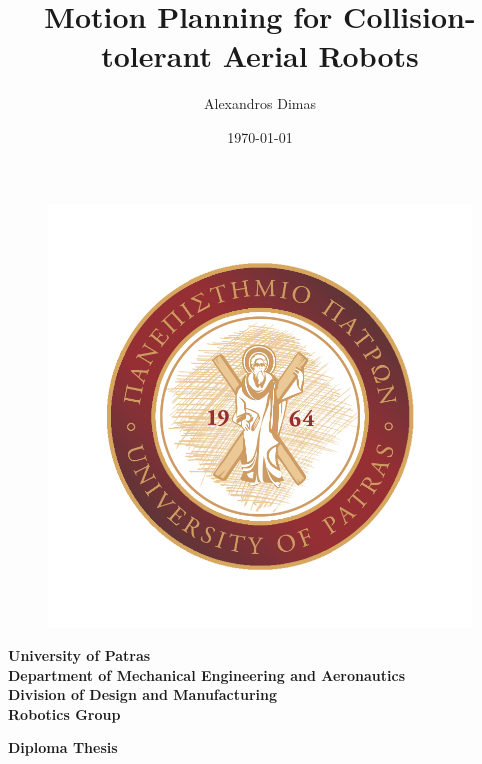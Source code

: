 \documentclass[twoside]{report}
\title{Motion Planning for Collision-tolerant Aerial Robots}
\author{Alexandros Dimas}
\date{\today}
\begin{document}
\begin{titlepage}


\begin{minipage}{0.25\textwidth}
\begin{figure}[H]
\includegraphics[width =\textwidth]{images/logo-up-4color-stamp.png}
\end{figure}
\end{minipage} \hfill
\begin{minipage}{0.85\textwidth}
{
\large \textbf{University of Patras}\\
\large \textbf{Department of Mechanical Engineering and Aeronautics}\\
\large \textbf{Division of Design and Manufacturing}\\
\large \textbf{Robotics Group}
}
\end{minipage}

\vspace{1cm}

\centering
\large{\textbf{Diploma Thesis}}


\end{titlepage}
\end{document}
